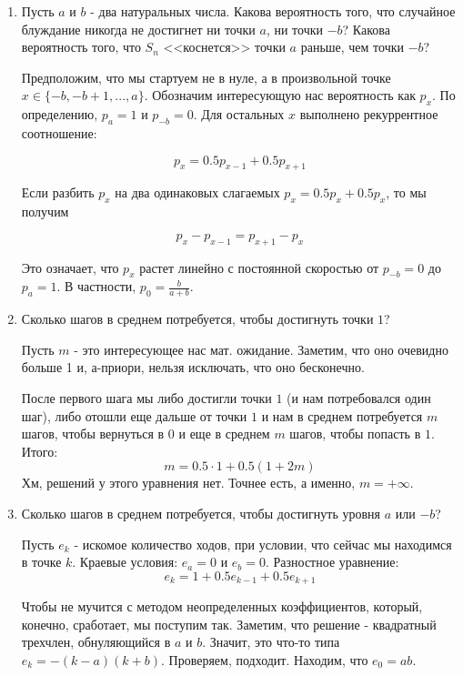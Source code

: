 {\begin{enumerate}
\item Пусть $a$ и $b$ - два натуральных числа. Какова вероятность того, что случайное блуждание никогда не достигнет ни точки $a$, ни точки $-b$? Какова вероятность того, что $S_{n}$ <<коснется>> точки $a$ раньше, чем точки $-b$?

Предположим, что мы стартуем не в нуле, а в произвольной точке $ x\in\{-b,-b+1,..., a\} $. Обозначим интересующую нас вероятность как $ p_{x} $. По определению, $ p_{a}=1 $ и $ p_{-b}=0 $. Для остальных $ x $ выполнено рекуррентное соотношение:

\[ p_{x}=0.5p_{x-1}+0.5p_{x+1} \]

Если разбить $ p_{x} $ на два одинаковых слагаемых $ p_{x}=0.5p_{x}+0.5p_{x} $, то мы получим

\[ p_{x}-p_{x-1}=p_{x+1}-p_{x} \]

Это означает, что $ p_{x} $ растет линейно с постоянной скоростью от $ p_{-b}=0 $ до $ p_{a}=1 $. В частности, $ p_{0}=\frac{b}{a+b} $.


\item Сколько шагов в среднем потребуется, чтобы достигнуть точки $1$?

Пусть $m$ - это интересующее нас мат. ожидание. Заметим, что оно очевидно больше 1 и, а-приори, нельзя исключать, что оно бесконечно.

После первого шага мы либо достигли точки $1$ (и нам потребовался один шаг), либо отошли еще дальше от точки $1$ и нам в среднем потребуется $m$ шагов, чтобы вернуться в $0$ и еще в среднем $m$ шагов, чтобы попасть в $1$. Итого:
\begin{equation}
m=0.5\cdot 1 + 0.5 (1 + 2m)
\end{equation}
Хм, решений у этого уравнения нет. Точнее есть, а именно, $m=+\infty$.

\item Сколько шагов в среднем потребуется, чтобы достигнуть уровня $a$ или $-b$?

Пусть $e_{k}$ - искомое количество ходов, при условии, что сейчас мы находимся в точке $k$. Краевые условия: $e_{a}=0$ и $e_{b}=0$. Разностное уравнение:
\begin{equation}
e_{k}=1+0.5e_{k-1}+0.5e_{k+1}
\end{equation}

Чтобы не мучится с методом неопределенных коэффициентов, который, конечно, сработает, мы поступим так. Заметим, что решение - квадратный трехчлен, обнуляющийся в $a$ и $b$. Значит, это что-то типа $e_{k}=-(k-a)(k+b)$. Проверяем, подходит. Находим, что $e_{0}=ab$.


\end{enumerate}}
